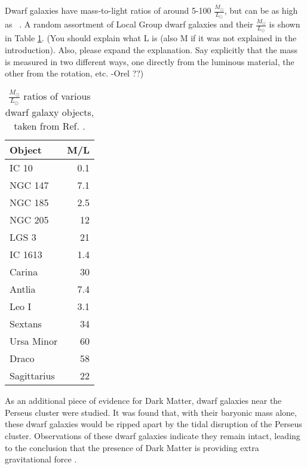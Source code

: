     Dwarf galaxies have mass-to-light ratios of around 5-100 $\frac{M_\odot}{L_\odot}$, but can be as high as ~\cite{Simon2007_dwarfgalaxykeck}.
    A random assortment of Local Group dwarf galaxies and their $\frac{M_\odot}{L_\odot}$ is shown in Table \ref{tab:mlratios:dwarfgals}.
    {\color{red}(You should explain what L is (also M if it was not explained in the introduction).  Also, please expand the explanation. Say explicitly that the mass is measured in two different ways, one directly from the luminous material, the other from the rotation, etc. -Orel ??)}
    
    \begin{table}[]
      \centering
      \caption{$\frac{M_\odot}{L_\odot}$ ratios of various dwarf galaxy objects, taken from Ref. \cite{localdwarfs}.}
      \label{tab:mlratios:dwarfgals}
      \begin{tabular}{l r}
        Object      &  M/L \\
        \hline
        IC 10       &  0.1 \\
        NGC 147     &  7.1 \\
        NGC 185     &  2.5 \\
        NGC 205     & 12   \\
        LGS 3       & 21   \\
        IC 1613     &  1.4 \\
        Carina      & 30   \\
        Antlia      &  7.4 \\
        Leo I       &  3.1 \\
        Sextans     & 34   \\
        Ursa Minor  & 60   \\
        Draco       & 58   \\
        Sagittarius & 22   \\
      \end{tabular}
    \end{table}
    
    As an additional piece of evidence for Dark Matter, dwarf galaxies near the Perseus cluster were studied.
    It was found that, with their baryonic mass alone, these dwarf galaxies would be ripped apart by the tidal disruption of the Perseus cluster.
    Observations of these dwarf galaxies indicate they remain intact, leading to the conclusion that the presence of Dark Matter is providing extra gravitational force \cite{Penny2009}.
    
    \FloatBarrier

